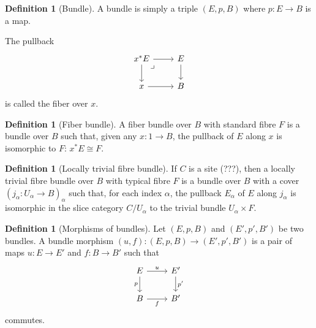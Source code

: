 \documentclass[reqno]{amsart}
\theoremstyle{definition}
\newtheorem{definition}[theorem]{Definition}
\theoremstyle{remark}
\begin{document}
    \begin{definition}[Bundle]
        A bundle is simply a triple
        $\left( E, p ,B \right) $ where
        $p \colon E \to B$ is a map.


        The pullback
        \begin{equation*}
        \begin{tikzcd}
            x^{*} E \ar[r] \ar[d]
            \ar[dr, phantom, "\lrcorner", very
            near start] & E \ar[d] \\
            x \ar[r] & B
        \end{tikzcd}
        \end{equation*}
        is called the fiber over $x$.
    \end{definition}

    \begin{definition}[Fiber bundle]
        A fiber bundle over $B$ with standard fibre
        $F$ is a bundle over $B$ such that, given
        any $x \colon 1 \to B$, the pullback of $E$ along
        $x$ is isomorphic to $F$: $x^{*}E \cong F$.
    \end{definition}

    \begin{definition}[Locally trivial fibre bundle]
        If $C$ is a site (???), then a locally trivial fibre
        bundle over $B$ with typical fibre $F$ is a bundle
        over $B$ with a cover 
        $\left( j_{\alpha} \colon U_{\alpha}
        \to B\right)_{\alpha}$ such that, for each
        index $\alpha$, the pullback $E_{\alpha}$ of
        $E$ along $j_{\alpha}$ is isomorphic in the slice
        category $C / U_{\alpha}$ to the trivial bundle
        $U_{\alpha} \times F$.
    \end{definition}




    \newpage

    \begin{definition}[Morphisms of bundles]
        Let $\left( E,p,B \right) $ and
        $\left( E',p',B' \right) $ be two bundles.
        A bundle morphism
        $\left( u,f \right) \colon
        \left( E,p,B \right) \to \left( E',p',B' \right) $ 
        is a pair of maps
        $u \colon E \to E'$ and
        $f \colon B \to B'$ such that
        \begin{equation*}
        \begin{tikzcd}
            E \ar[r, "u"] \ar[d, "p"'] & E' \ar[d, "p'"]\\
            B \ar[r, "f"'] & B'
        \end{tikzcd}
        \end{equation*}
        commutes.
    \end{definition}
\end{document}
